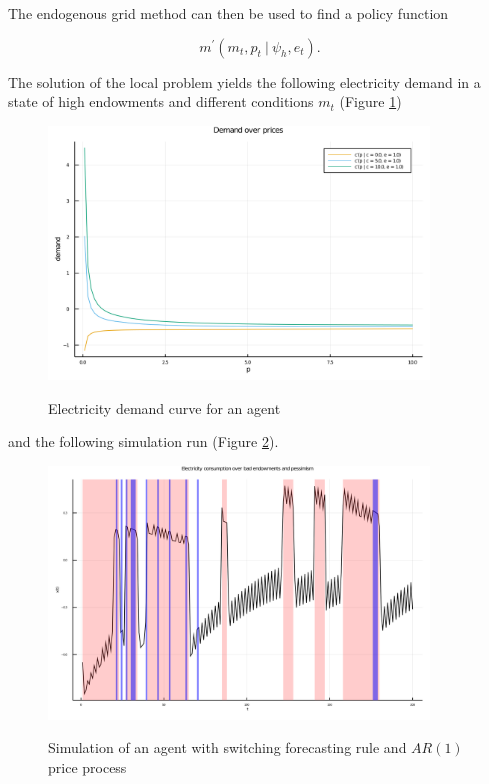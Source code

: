 \documentclass[american]{scrartcl}
\begin{document}
The endogenous grid method can then be used to find a policy function

\begin{equation}
    m^\prime(m_t, p_t \ \vert \ \psi_h, e_t).
\end{equation}

The solution of the local problem yields the following electricity demand in a state of high endowments and different conditions $m_t$ (Figure \ref{fig:demand})

\begin{figure}[b]
    \centering
    \includegraphics[width=0.9\textwidth]{../../plots/markets/pricedemand.png}
    \label{fig:demand}
    \caption{Electricity demand curve for an agent}
\end{figure}

and the following simulation run (Figure \ref{fig:sim}).

\begin{figure}
    \centering
    \includegraphics[width=0.9\textwidth]{../../plots/markets/simul.png}
    \label{fig:sim}
    \caption{Simulation of an agent with switching forecasting rule and $AR(1)$ price process}
\end{figure}
\end{document}
